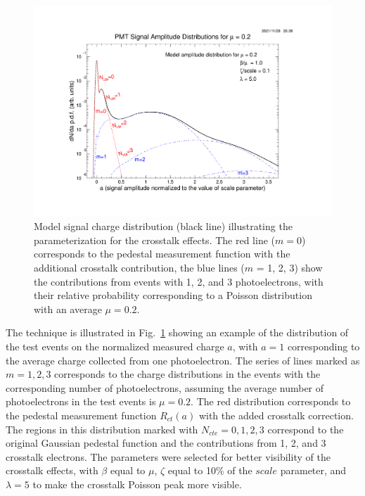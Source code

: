 \begin{figure}[hbt]
	\centering
	\includegraphics[width=0.98\linewidth, trim=80 55 105 105, clip]{figures/model.pdf}
	\caption{Model  signal  charge  distribution  (black  line)  illustrating  the parameterization for the crosstalk effects. The red line ($m=0$) corresponds to the pedestal measurement function with the additional crosstalk contribution, the blue lines ($m$ = 1, 2, 3) show the contributions from events with 1, 2, and 3 photoelectrons, with their relative probability corresponding to a Poisson distribution with an average $\mu=0.2$.}
	\label{fig:Model}
\end{figure}


The technique is illustrated in Fig.~\ref{fig:Model} showing an example of the distribution of the test events on the normalized measured charge $a$, with $a=1$ corresponding to the average charge collected from one photoelectron. The series of lines marked as $m = 1, 2, 3$ corresponds to the charge distributions in the events with the corresponding number of photoelectrons, assuming the average number of photoelectrons in the test events is $\mu = 0.2$. The red distribution corresponds to the pedestal measurement function $R_{ct}(a)$ with the added crosstalk correction. The regions in this distribution marked with $N_{cte}=0, 1, 2, 3$ correspond to the original Gaussian pedestal function and the contributions from 1, 2, and 3 crosstalk electrons. The parameters were selected for better visibility of the crosstalk effects, with $\beta$ equal to $\mu$, $\zeta$ equal to 10\% of the $scale$ parameter, and $\lambda = 5$ to make the crosstalk Poisson peak more visible.  


